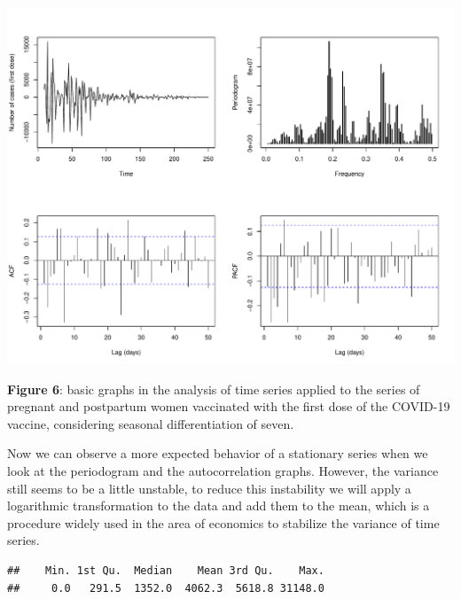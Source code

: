 \documentclass[
]{article}
\newenvironment{Shaded}{\begin{snugshade}}{\end{snugshade}}
\newcommand{\DocumentationTok}[1]{\textcolor[rgb]{0.56,0.35,0.01}{\textbf{\textit{#1}}}}
\newcommand{\FunctionTok}[1]{\textcolor[rgb]{0.13,0.29,0.53}{\textbf{#1}}}
\newcommand{\NormalTok}[1]{#1}
\newcommand{\SpecialCharTok}[1]{\textcolor[rgb]{0.81,0.36,0.00}{\textbf{#1}}}
\renewenvironment{Shaded}{\begin{mdframed}[ backgroundcolor=shadecolor, linecolor = shadecolor, leftmargin=\dimexpr\leftmargin-2pt\relax, innerleftmargin=1.6pt, innertopmargin=5pt, skipabove=10pt,skipbelow=3pt ]}{\end{mdframed}}
\begin{document}
\begin{center}\includegraphics[width=\linewidth]{IF_results_ENG_files/figure-latex/unnamed-chunk-7-1} \end{center}

\textbf{Figure 6}: basic graphs in the analysis of time series applied
to the series of pregnant and postpartum women vaccinated with the first
dose of the COVID-19 vaccine, considering seasonal differentiation of
seven.

Now we can observe a more expected behavior of a stationary series when
we look at the periodogram and the autocorrelation graphs. However, the
variance still seems to be a little unstable, to reduce this instability
we will apply a logarithmic transformation to the data and add them to
the mean, which is a procedure widely used in the area of economics to
stabilize the variance of time series.

\begin{Shaded}
\end{Shaded}

\begin{verbatim}
##    Min. 1st Qu.  Median    Mean 3rd Qu.    Max. 
##     0.0   291.5  1352.0  4062.3  5618.8 31148.0
\end{verbatim}
\end{document}
